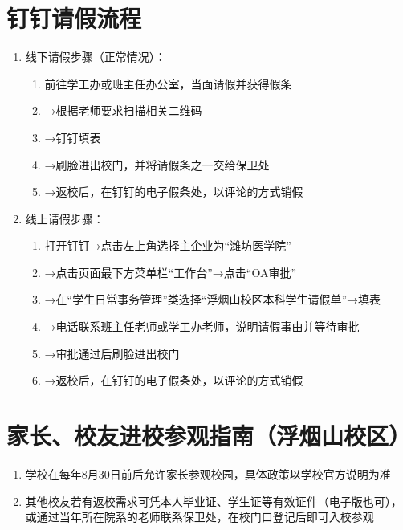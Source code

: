 \section[钉钉请假流程]{钉钉请假\footnotemark 流程}
\label{leave_dingtalk}
\begin{enumerate}
      \item 线下请假步骤（正常情况）：
            \begin{enumerate}
                  \item 前往学工办或班主任办公室，当面请假并获得假条
                  \item →根据老师要求扫描相关二维码
                  \item →钉钉填表
                  \item →刷脸进出校门，并将请假条之一交给保卫处
                  \item →返校后，在钉钉的电子假条处，以评论的方式销假
            \end{enumerate}
      \item 线上请假步骤：
            \begin{enumerate}
                  \item 打开钉钉→点击左上角选择主企业为“潍坊医学院”
                  \item →点击页面最下方菜单栏“工作台”→点击“OA审批”
                  \item →在“学生日常事务管理”类选择“浮烟山校区本科学生请假单”→填表
                  \item →电话联系班主任老师或学工办老师，说明请假事由并等待审批
                  \item →审批通过后刷脸进出校门
                  \item →返校后，在钉钉的电子假条处，以评论的方式销假
            \end{enumerate}
\end{enumerate}

\section[家长、校友进校参观指南（浮烟山校区）]{家长、校友进校参观指南（浮烟山校区）}
\begin{enumerate}
      \item 学校在每年8月30日前后允许家长参观校园\footnotemark，具体政策以学校官方说明为准
      \item 其他校友若有返校需求可凭本人毕业证、学生证等有效证件（电子版也可），或通过当年所在院系的老师联系保卫处，在校门口登记后即可入校参观
\end{enumerate}

